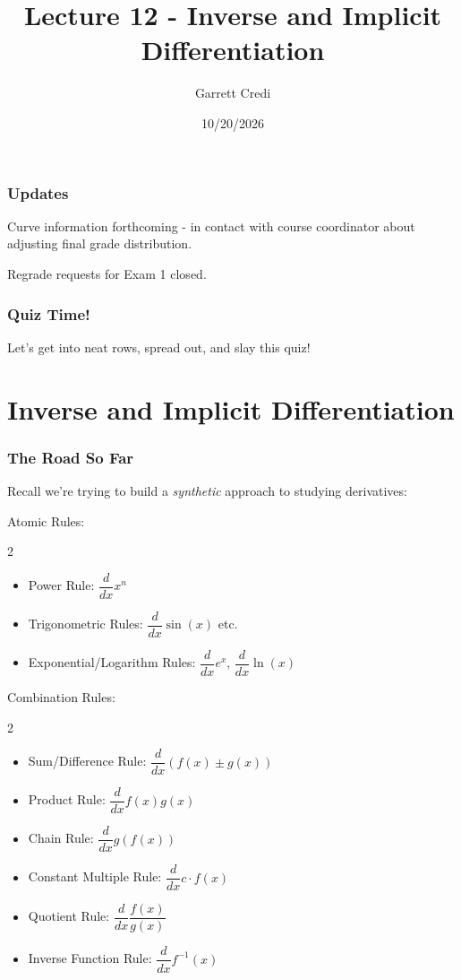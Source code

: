 \documentclass{ltx-talk}
\title{Lecture 12 - Inverse and Implicit Differentiation}
\author{Garrett Credi}
\date{10/20/2026}
\begin{document}
\begin{frame}
  \maketitle
\end{frame}

\begin{frame}
  \frametitle{Updates}

  Curve information forthcoming - in contact with course coordinator about adjusting final grade distribution.

  Regrade requests for Exam 1 closed.
\end{frame}

\begin{frame}
  \frametitle{Quiz Time!}

  Let's get into neat rows, spread out, and slay this quiz!
\end{frame}

\section{Inverse and Implicit Differentiation}

\begin{frame}
  \frametitle{The Road So Far}
      Recall we're trying to build a \textit{synthetic} approach to studying derivatives: \pause

    Atomic Rules: \pause
  \begin{multicols}{2}
    \begin{itemize}
      \item Power Rule: $\dfrac{d}{dx} x^n$ 
      \item Trigonometric Rules: $\dfrac{d}{dx} \sin(x)$ etc.
      \item Exponential/Logarithm Rules: $\dfrac{d}{dx} e^x$, $\dfrac{d}{dx} \ln(x)$
    \end{itemize}
  \end{multicols}

  Combination Rules: \pause
  \begin{multicols}{2}
    \begin{itemize}
      \item Sum/Difference Rule: $\dfrac{d}{dx} (f(x) \pm g(x))$ 
      \item Product Rule: $\dfrac{d}{dx} f(x)g(x)$ 
      \item Chain Rule: $\dfrac{d}{dx} g(f(x))$ 
      \item Constant Multiple Rule: $\dfrac{d}{dx} c \cdot f(x)$
      \item Quotient Rule: $\dfrac{d}{dx} \dfrac{f(x)}{g(x)}$ 
      \item Inverse Function Rule: $\dfrac{d}{dx} f^{-1}(x)$
    \end{itemize}
  \end{multicols}
\end{frame}
\end{document}
